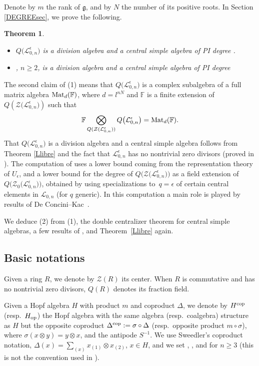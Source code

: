 \documentclass[10pt,a4paper]{amsart}
\numberwithin{equation}{section}
\newtheorem{teo}{Theorem}[section]
\theoremstyle{definition}
\newcommand{\e}{\epsilon}
\newcommand{\Ll}{{\mathcal L}}
\begin{document}
Denote by $m$ the rank of $\mathfrak{g}$, and by $N$ the number of its positive roots. In Section \ref{DEGREEsec}, we prove the following.


\begin{teo}\label{degree} \quad
\begin{itemize}\itemsep=0pt
\item[$(1)$] $Q\bigl(\Ll_{0,n}^\e\bigr)$ is a division algebra and a central simple algebra of PI degree .
\item[$(2)$] \smash{$Q\big(\bigl(\Ll_{0,n}^\e\bigr)^{U_\e}\!\big)$}, $n\!\geq\! 2$, is a division algebra and a central simple algebra of PI degree~
 \end{itemize}
\end{teo}


The second claim of (1) means that $Q\bigl(\Ll_{0,n}^\e\bigr)$ is a complex subalgebra of a full matrix algebra ${\rm Mat}_d(\mathbb{F})$, where $d=l^{nN}$ and $\mathbb{F}$ is a finite extension of $Q(\mathcal{Z}\bigl(\Ll_{0,n}^\e\bigr))$ such that
\[\mathbb{F}\bigotimes_{Q(\mathcal{Z} (\Ll_{0,n}^\e ))} Q\bigl(\Ll_{0,n}^\e\bigr) = {\rm Mat}_d(\mathbb{F}).\]
That $Q\bigl(\Ll_{0,n}^\e\bigr)$ is a division algebra and a central simple algebra follows from Theorem \ref{Llibre} and the fact that $\Ll_{0,n}^\e$ has no nontrivial zero divisors (proved in \cite{BR}). The computation of  uses a lower bound coming from the representation theory of $U_\e$, and a lower bound for the degree of $Q\bigl(\mathcal{Z}\bigl(\Ll_{0,n}^\e\bigr)\bigr)$ as a field extension of $Q\bigl(\mathcal{Z}_0\bigl(\Ll_{0,n}^\e\bigr)\bigr)$, obtained by using specializations to~${q=\e}$ of certain central elements in $\Ll_{0,n}$ (for $q$ generic). In this computation a main role is played by results of De Concini--Kac~\cite{DC-K}.


We deduce (2) from (1), the double centralizer theorem for central simple algebras, a few results of \cite{BR,DC-L}, and Theorem~\ref{Llibre} again.

\subsection{Basic notations} Given a ring $R$, we denote by $\mathcal{Z}(R)$ its center. When $R$ is commutative and has no nontrivial zero divisors, $Q(R)$ denotes its fraction field.

Given a Hopf algebra $H$ with product $m$ and coproduct $\Delta$, we denote by $H^{\rm cop}$ (resp.~$H_{\rm op}$) the Hopf algebra with the same algebra (resp.\ coalgebra) structure as $H$ but the opposite coproduct $\Delta^{\rm cop}:=\sigma \circ {\Delta}$ (resp.\ opposite product $m\circ \sigma$), where $\sigma(x\otimes y) = y\otimes x$, and the antipode ${S}^{-1}$. We use Sweedler's coproduct notation, $ \Delta(x) = \sum_{(x)}x_{(1)} \otimes x_{(2)}$, $x\in H$, and we set , , and  for $n\geq 3$ (this is not the convention used in \cite{BR}).
\end{document}
